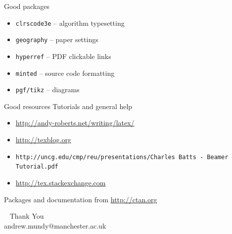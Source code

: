 \documentclass[t]{beamer}
\begin{document}
\begin{darkframes}
  \begin{frame}{Good packages}
    \begin{itemize}
      \item \texttt{clrscode3e}  -- algorithm typesetting
      \item \texttt{geography} -- paper settings
      \item \texttt{hyperref} -- PDF clickable links
      \item \texttt{minted} -- source code formatting
      \item \texttt{pgf/tikz} -- diagrams
    \end{itemize}
  \end{frame}

  \begin{frame}{Good resources}
    Tutorials and general help
    \begin{itemize}
      \footnotesize
      \item \url{http://andy-roberts.net/writing/latex/}
      \item \url{http://texblog.org}
      \item \texttt{http://uncg.edu/cmp/reu/presentations/Charles Batts - Beamer Tutorial.pdf}
      \item \url{http://tex.stackexchange.com}
    \end{itemize}

    Packages and documentation from \url{http://ctan.org}
  \end{frame}

  \begin{frame}{~}
    \centering
    \vfill
    {\huge Thank You}\\
    andrew.mundy@manchester.ac.uk
    \vfill
  \end{frame}
\end{darkframes}
\end{document}
